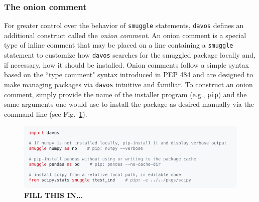 \documentclass[preprint,12pt, a4paper]{elsarticle}
\begin{document}
\subsubsection{The onion comment}
For greater control over the behavior of \texttt{smuggle} statements, \texttt{davos} defines an additional construct called the \textit{onion comment}. An onion comment is a special type of inline comment that may be placed on a line containing a \texttt{smuggle} statement to customize how \texttt{davos} searches for the smuggled package locally and, if necessary, how it should be installed. Onion comments follow a simple syntax based on the ``type comment" syntax introduced in PEP 484 \cite{vanREtal14} and are designed to make managing packages via \texttt{davos} intuitive and familiar. To construct an onion comment, simply provide the name of the installer program (e.g., \texttt{pip}) and the same arguments one would use to install the package as desired manually via the command line (see Fig.~\ref{fig:snippet1}).

\begin{figure}[h]
\centering
\includegraphics[width=\textwidth]{snippets/snippet1.pdf}
\caption{\small \textbf{FILL THIS IN...}}
\label{fig:snippet1}
\end{figure}



%
%
%
%
%
\end{document}
